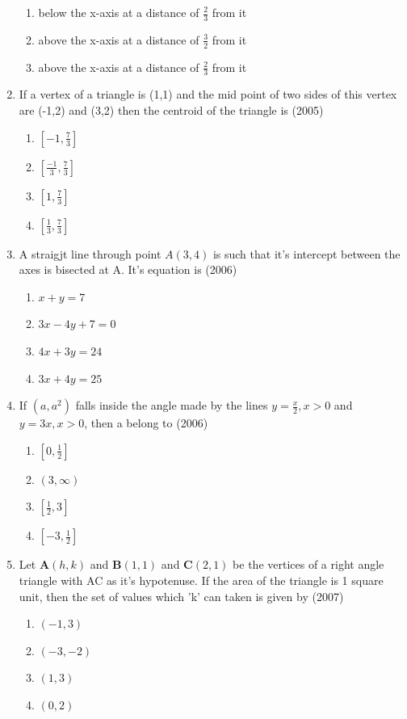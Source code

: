 \documentclass[12pt]{article}
\let\vec\mathbf
\begin{document}
\begin{enumerate}
\begin{enumerate}
\item below the x-axis at a distance of $\frac{2}{3}$ from it
\item above the x-axis at a distance of $\frac{3}{2}$ from it
\item above the x-axis at a distance of $\frac{2}{3}$ from it
\end{enumerate}
\item If a vertex of a triangle is (1,1) and the mid point of two sides of this vertex are (-1,2) and (3,2) then the centroid of the triangle is (2005)
\begin{enumerate}
\item $\left[-1,\frac{7}{3}\right]$ 
\item $\left[ \frac{-1}{3},\frac{7}{3}\right]$ 
\item $\left[1,\frac{7}{3}\right]$  
\item $\left[ \frac{1}{3},\frac{7}{3}\right]$ 
\end{enumerate}
\item A straigjt line through point $A(3,4)$ is such that it's intercept between the axes is bisected at A. It's equation is (2006)
\begin{enumerate}
\item $x+y=7$ 
\item $3x-4y+7=0$  
\item $4x+3y=24$ 
\item $3x+4y=25$
\end{enumerate}
\item If $(a,a^2)$ falls inside the angle made by the lines $y= \frac{x}{2}, x>0$ and $y=3x, x>0$, then a belong to (2006)
\begin{enumerate}
\item $\left[ 0,\frac{1}{2}\right]$ 
\item $(3,\infty)$ 
\item $\left[\frac{1}{2},3\right]$ 
\item $\left[-3,\frac{1}{2}\right]$
\end{enumerate}
\item Let $\vec{A}(h,k)$ and $\vec{B}(1,1)$ and $\vec{C}(2,1)$ be the vertices of a right angle triangle with AC as it's hypotenuse. If the area of the triangle is 1 square unit, then the set of values which 'k' can taken is given by (2007)
\begin{enumerate}
\item $(-1,3)$ 
\item $(-3,-2)$
\item $(1,3)$ 
\item $(0,2)$

\end{enumerate}
\end{enumerate}
\end{document}
